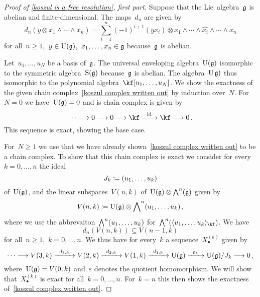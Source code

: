 \begin{proof}[Proof of \cref{koszul is a free resolution}, first part]
  Suppose that the Lie~algebra~$\mathfrak{g}$ is abelian and finite-dimensional.
  The maps~$d_n$ are given by
  \[
    d_n( y \otimes x_1 \wedge \dotsb \wedge x_n )
    =
    \sum_{i=1}^n
    (-1)^{i+1}
    (y x_i) \otimes x_1 \wedge \dotsb \wedge \widehat{x_i} \wedge \dotsb \wedge x_n
  \]
  for all~$n \geq 1$,~$y \in \operatorname{U}(\mathfrak{g})$,~$x_1, \dotsc, x_n \in \mathfrak{g}$ because~$\mathfrak{g}$ is abelian.

  Let~$u_1, \dotsc, u_N$ be a basis of~$\mathfrak{g}$.
  The universal enveloping algebra~$\operatorname{U}(\mathfrak{g})$ isomorphic to the symmetric algebra~$\operatorname{S}(\mathfrak{g})$ because~$\mathfrak{g}$ is abelian.
  The algebra~$\operatorname{U}\mathfrak{g})$ thus isomorphic to the polynomial algebra~$\kf[u_1, \dotsc, u_N]$.
  We show the exactness of the given chain complex~\eqref{koszul complex written out} by induction over~$N$.
  For~$N = 0$ we have~$\operatorname{U}(\mathfrak{g}) = 0$ and is chain complex is given by
  \[
    \dotsb
    \to
    0
    \to
    0
    \to
    \kf
    \xto{\id}
    \kf
    \to
    0 \,.
  \]
  This sequence is exact, showing the base case.

  For~$N \geq 1$ we use that we have already shown~\eqref{koszul complex written out} to be a chain complex.
  To show that this chain complex is exact we consider for every~$k = 0, \dotsc, n$ the ideal
  \[
    J_k
    \coloneqq
    \lparen u_1, \dotsc, u_k\rparen
  \]
  of~$\operatorname{U}(\mathfrak{g})$, and the linear subspaces~$V(n,k)$ of~$\operatorname{U}(\mathfrak{g}) \otimes \operatorname{\bigwedge}^n(\mathfrak{g})$ given by
  \[
    V(n,k)
    \coloneqq
    \operatorname{U}(\mathfrak{g}) \otimes \operatorname{\bigwedge}^n(u_1, \dotsc, u_k)  \,,
  \]
  where we use the abbrevaiton~$\operatorname{\bigwedge}^n(u_1, \dotsc, u_k)$ for~$\Exterior^n( \gen{u_1, \dotsc, u_k}_{\kf} )$.
  We have
  \[
    d_n( V(n, k) )
    \subseteq
    V(n-1, k)
  \]
  for all~$n \geq 1$,~$k = 0, \dotsc, n$.
  We thus have for every~$k$ a sequence~$X^{(k)}_\bullet$ given by
  \[
    \dotsb
    \to
    V(3,k)
    \xto{d_{3,k}}
    V(2,k)
    \xto{d_{2,k}}
    V(1,k)
    \xto{d_{1,k}}
    \Univ(\glie)
    \xto{\varepsilon_k}
    \Univ(\glie) / J_k
    \to
    0 \,,
  \]
  where~$\operatorname{U}(\mathfrak{g}) = V(0,k)$ and~$\varepsilon$ denotes the quotient homomorphism.
  We will show that~$X^{(k)}_\bullet$ is exact for all~$k = 0, \dotsc, n$.
  For~$k = n$ this then shows the exactness of~\eqref{koszul complex written out}.


\end{proof}
